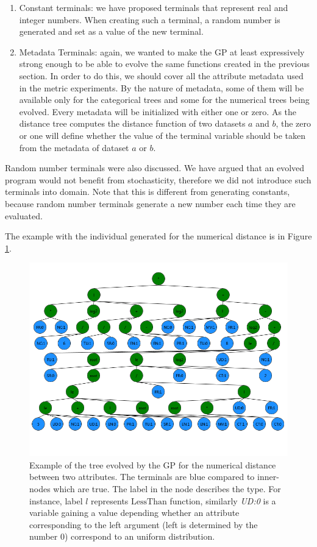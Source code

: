  \begin{enumerate}
 	\item Constant terminals: we have proposed terminals that represent real and integer numbers. When creating such a terminal, a random number is generated and set as a value of the new terminal.
 	\item Metadata Terminals: again, we wanted to make the GP at least expressively strong enough to be able to evolve the same functions created in the previous section. In order to do this, we should cover all the attribute metadata used in the metric experiments. By the nature of metadata, some of them will be available only for the categorical trees and some for the numerical trees being evolved. Every metadata will be initialized with either one or zero. As the distance tree computes the distance function of two datasets $a$ and $b$, the zero or one will define whether the value of the terminal variable should be taken from the metadata of dataset $a$ or $b$.
 \end{enumerate}
 
 Random number terminals were also discussed. We have argued that an evolved program would not benefit from stochasticity, therefore we did not introduce such terminals into domain. Note that this is different from generating constants, because random number terminals generate a new number each time they are evaluated.
 
 The example with the individual generated for the numerical distance is in Figure \ref{fig:individualExample}.
 
 \begin{figure}
 	\includegraphics[width=14cm]{Images/individualExample.png}
 	\centering
 	\caption{Example of the tree evolved by the GP for the numerical distance between two attributes. The terminals are blue compared to inner-nodes which are true. The label in the node describes the type. For instance, label $l$ represents $\text{LessThan}$ function, similarly \emph{UD:0} is a variable gaining a value depending whether an attribute corresponding to the left argument (left is determined by the number 0) correspond to an uniform distribution.}
 	\label{fig:individualExample}	
 \end{figure}
 

